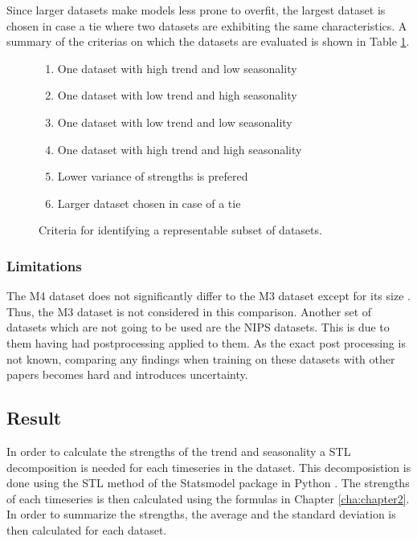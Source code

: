 Since larger datasets make models less prone to overfit, the largest dataset is chosen in case a tie where two datasets are exhibiting the same characteristics. A summary of the criterias on which the datasets are evaluated is shown in Table \ref{dataset_criteria}.

\begin{figure}[h]
  \begin{enumerate}
    \item One dataset with high trend and low seasonality
    \item One dataset with low trend and high seasonality
    \item One dataset with low trend and low seasonality
    \item One dataset with high trend and high seasonality
    \item Lower variance of strengths is prefered
    \item Larger dataset chosen in case of a tie
  \end{enumerate}
  \caption{Criteria for identifying a representable subset of datasets.}
  \label{dataset_criteria}
\end{figure}


\subsubsection{Limitations}
The M4 dataset does not significantly differ to the M3 dataset except for its size \cite{m3_vs_M4}. Thus, the M3 dataset is not considered in this comparison. Another set of datasets which are not going to be used are the NIPS datasets. This is due to them having had postprocessing applied to them. As the exact post processing is not known, comparing any findings when training on these datasets with other papers becomes hard and introduces uncertainty.

\subsection{Result}
In order to calculate the strengths of the trend and seasonality a STL decomposition is needed for each timeseries in the dataset. This decomposistion is done using the STL method of the Statsmodel package in Python \cite{seabold2010statsmodels}. The strengths of each timeseries is then calculated using the formulas in Chapter \ref{cha:chapter2}. In order to summarize the strengths, the average and the standard deviation is then calculated for each dataset.

